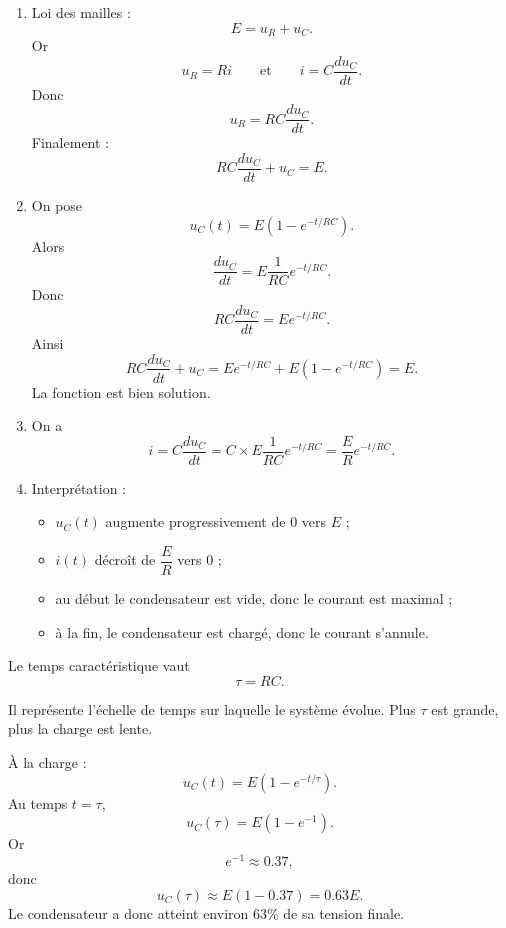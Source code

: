 \documentclass[11pt,a4paper]{article}
\begin{document}
\begin{corrigebox}
\begin{enumerate}[label=\alph*)]
    \item Loi des mailles :
    \[
    E=u_R+u_C.
    \]
    Or
    \[
    u_R=Ri
    \qquad \text{et} \qquad
    i=C\frac{du_C}{dt}.
    \]
    Donc
    \[
    u_R=RC\frac{du_C}{dt}.
    \]
    Finalement :
    \[
    RC\frac{du_C}{dt}+u_C=E.
    \]

    \item On pose
    \[
    u_C(t)=E\left(1-e^{-t/RC}\right).
    \]
    Alors
    \[
    \frac{du_C}{dt}=E\frac{1}{RC}e^{-t/RC}.
    \]
    Donc
    \[
    RC\frac{du_C}{dt}=Ee^{-t/RC}.
    \]
    Ainsi
    \[
    RC\frac{du_C}{dt}+u_C
    =
    Ee^{-t/RC}+E\left(1-e^{-t/RC}\right)=E.
    \]
    La fonction est bien solution.

    \item On a
    \[
    i=C\frac{du_C}{dt}
    =C\times E\frac{1}{RC}e^{-t/RC}
    =\frac{E}{R}e^{-t/RC}.
    \]

    \item Interprétation :
    \begin{itemize}
        \item \(u_C(t)\) augmente progressivement de \(0\) vers \(E\) ;
        \item \(i(t)\) décroît de \(\dfrac{E}{R}\) vers \(0\) ;
        \item au début le condensateur est vide, donc le courant est maximal ;
        \item à la fin, le condensateur est chargé, donc le courant s'annule.
    \end{itemize}
\end{enumerate}
\end{corrigebox}

\begin{corrigebox}
Le temps caractéristique vaut
\[
\tau=RC.
\]

Il représente l'échelle de temps sur laquelle le système évolue. Plus \(\tau\) est grande, plus la charge est lente.

À la charge :
\[
u_C(t)=E\left(1-e^{-t/\tau}\right).
\]
Au temps \(t=\tau\),
\[
u_C(\tau)=E\left(1-e^{-1}\right).
\]
Or
\[
e^{-1}\approx 0.37,
\]
donc
\[
u_C(\tau)\approx E(1-0.37)=0.63E.
\]
Le condensateur a donc atteint environ \(63\%\) de sa tension finale.
\end{corrigebox}
\end{document}
